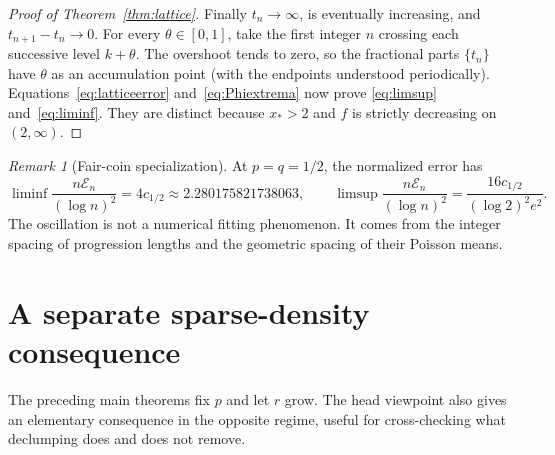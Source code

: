 \documentclass[11pt]{article}
\theoremstyle{definition}\newtheorem{definition}[theorem]{Definition}
\theoremstyle{remark}\newtheorem{remark}[theorem]{Remark}
\begin{document}
\begin{proof}[Proof of Theorem~\ref{thm:lattice}]
Finally $t_n\to\infty$, is eventually increasing, and
$t_{n+1}-t_n\to0$. For every $\theta\in[0,1]$, take the first integer
$n$ crossing each successive level $k+\theta$. The overshoot tends to
zero, so the fractional parts $\{t_n\}$ have $\theta$ as an accumulation
point (with the endpoints understood periodically).
Equations~\eqref{eq:latticeerror} and~\eqref{eq:Phiextrema} now prove
\eqref{eq:limsup} and~\eqref{eq:liminf}. They are distinct because
$x_*>2$ and $f$ is strictly decreasing on $(2,\infty)$.
\end{proof}

\begin{remark}[Fair-coin specialization]
At $p=q=1/2$, the normalized error has
\[
 \liminf\frac{n\mathcal E_n}{(\log n)^2}=4c_{1/2}
       \approx2.280175821738063,
 \qquad
 \limsup\frac{n\mathcal E_n}{(\log n)^2}
       =\frac{16c_{1/2}}{(\log2)^2e^2}.
\]
The oscillation is not a numerical fitting phenomenon. It comes from the
integer spacing of progression lengths and the geometric spacing of their
Poisson means.
\end{remark}

\section{A separate sparse-density consequence}\label{sec:sparse}
The preceding main theorems fix $p$ and let $r$ grow. The head viewpoint
also gives an elementary consequence in the opposite regime, useful for
cross-checking what declumping does and does not remove.
\end{document}
